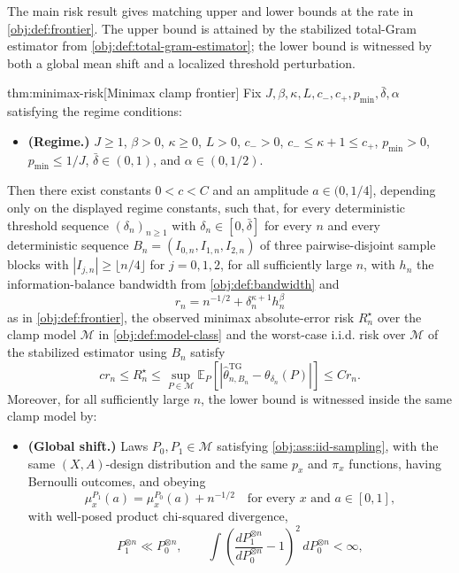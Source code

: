 \documentclass[11pt]{article}
\begin{document}
The main risk result gives matching upper and lower bounds at the rate in \cref{obj:def:frontier}. The upper bound is attained by the stabilized total-Gram estimator from \cref{obj:def:total-gram-estimator}; the lower bound is witnessed by both a global mean shift and a localized threshold perturbation.

\begin{theoremv}{thm:minimax-risk}[Minimax clamp frontier]
Fix \(J,\beta,\kappa,L,c_-,c_+,p_{\min},\bar\delta,\alpha\) satisfying the regime conditions:
\begin{itemize}
\item \textbf{(Regime.)} \(J\geq 1\), \(\beta>0\), \(\kappa\geq0\), \(L>0\), \(c_->0\), \(c_-\leq \kappa+1\leq c_+\), \(p_{\min}>0\), \(p_{\min}\leq 1/J\), \(\bar\delta\in(0,1)\), and \(\alpha\in(0,1/2)\).
\end{itemize}
Then there exist constants \(0<c<C\) and an amplitude \(a\in(0,1/4]\), depending only on the displayed regime constants, such that, for every deterministic threshold sequence \((\delta_n)_{n\geq1}\) with \(\delta_n\in[0,\bar\delta]\) for every \(n\) and every deterministic sequence \(B_n=(I_{0,n},I_{1,n},I_{2,n})\) of three pairwise-disjoint sample blocks with \(|I_{j,n}|\geq \lfloor n/4\rfloor\) for \(j=0,1,2\), for all sufficiently large \(n\), with \(h_n\) the information-balance bandwidth from \cref{obj:def:bandwidth} and
\[
r_n=n^{-1/2}+\delta_n^{\kappa+1}h_n^\beta
\]
as in \cref{obj:def:frontier}, the observed minimax absolute-error risk \(R_n^\star\) over the clamp model \(\mathcal M\) in \cref{obj:def:model-class} and the worst-case i.i.d. risk over \(\mathcal M\) of the stabilized estimator using \(B_n\) satisfy
\[
c r_n
\leq
R_n^\star
\leq
\sup_{P\in\mathcal M} \mathbb E_P\!\left[
\left|\widehat\theta_{n,B_n}^{\mathrm{TG}}-\theta_{\delta_n}(P)\right|
\right]
\leq
C r_n .
\]
Moreover, for all sufficiently large \(n\), the lower bound is witnessed inside the same clamp model by:
\begin{itemize}
\item \textbf{(Global shift.)} Laws \(P_0,P_1\in\mathcal M\) satisfying \cref{obj:ass:iid-sampling}, with the same \((X,A)\)-design distribution and the same \(p_x\) and \(\pi_x\) functions, having Bernoulli outcomes, and obeying
\[
\mu_x^{P_1}(a)=\mu_x^{P_0}(a)+n^{-1/2}
\quad\text{for every }x\text{ and }a\in[0,1],
\]
with well-posed product chi-squared divergence,
\[
P_1^{\otimes n}\ll P_0^{\otimes n},
\qquad
\int \left(\frac{dP_1^{\otimes n}}{dP_0^{\otimes n}}-1\right)^2\,dP_0^{\otimes n}<\infty,
\]
\end{itemize}
\end{theoremv}
\end{document}
